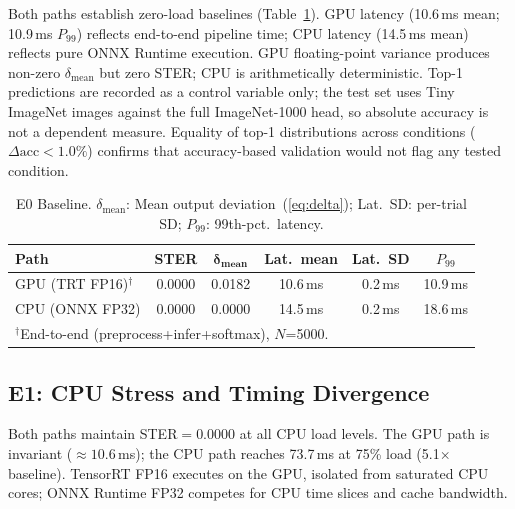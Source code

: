 \documentclass[journal,twoside,9pt]{IEEEtran}
\begin{document}
Both paths establish zero-load baselines (Table~\ref{tab:baseline}). GPU latency
(10.6\,ms mean; 10.9\,ms $P_{99}$) reflects end-to-end pipeline time; CPU latency
(14.5\,ms mean) reflects pure ONNX Runtime execution. GPU floating-point variance
produces non-zero $\delta_{\text{mean}}$ but zero STER; CPU is arithmetically
deterministic. Top-1 predictions are recorded as a control variable only; the test
set uses Tiny ImageNet images against the full ImageNet-1000 head, so absolute
accuracy is not a dependent measure. Equality of top-1 distributions across
conditions ($\Delta\text{acc}<1.0\%$) confirms that accuracy-based validation would
not flag any tested condition.

\begin{table}[t]
  \caption{E0 Baseline. $\delta_{\text{mean}}$: Mean output deviation~(\ref{eq:delta}); Lat.\ SD: per-trial SD; $P_{99}$: 99th-pct.\ latency.}
  \label{tab:baseline}
  \centering
  \footnotesize
  \setlength{\tabcolsep}{3pt}
  \begin{tabular}{@{}lccccc@{}}
    \toprule
    \textbf{Path} & \textbf{STER} & $\boldsymbol{\delta_{\text{mean}}}$ & \textbf{Lat.\ mean} & \textbf{Lat.\ SD} & \textbf{$P_{99}$} \\
    \midrule
    GPU (TRT FP16)$^\dagger$ & 0.0000 & 0.0182 & 10.6\,ms & 0.2\,ms & 10.9\,ms \\
    CPU (ONNX FP32) & 0.0000 & 0.0000 & 14.5\,ms & 0.2\,ms & 18.6\,ms \\
    \bottomrule
    \multicolumn{6}{l}{\scriptsize $^\dagger$End-to-end (preprocess+infer+softmax), $N$=5000.}
  \end{tabular}
\end{table}

\subsection{E1: CPU Stress and Timing Divergence}

Both paths maintain STER$=0.0000$ at all CPU load levels. The GPU path is invariant
(${\approx}10.6$\,ms); the CPU path reaches 73.7\,ms at 75\% load (5.1$\times$
baseline). TensorRT FP16 executes on the GPU, isolated from saturated CPU cores;
ONNX Runtime FP32 competes for CPU time slices and cache bandwidth.
\end{document}
